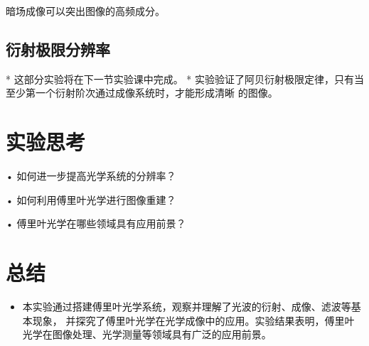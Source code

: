 \documentclass{ctexart}
\begin{document}
暗场成像可以突出图像的高频成分。
\subsection{衍射极限分辨率}
* 这部分实验将在下一节实验课中完成。
* 实验验证了阿贝衍射极限定律，只有当至少第一个衍射阶次通过成像系统时，才能形成清晰
的图像。


\section{实验思考}
• 如何进一步提高光学系统的分辨率？

• 如何利用傅里叶光学进行图像重建？

• 傅里叶光学在哪些领域具有应用前景？

\section{总结}
\begin{itemize}
  \item 本实验通过搭建傅里叶光学系统，观察并理解了光波的衍射、成像、滤波等基本现象，
  并探究了傅里叶光学在光学成像中的应用。实验结果表明，傅里叶光学在图像处理、光学测量等领域具有广泛的应用前景。

\end{itemize}
\end{document}
